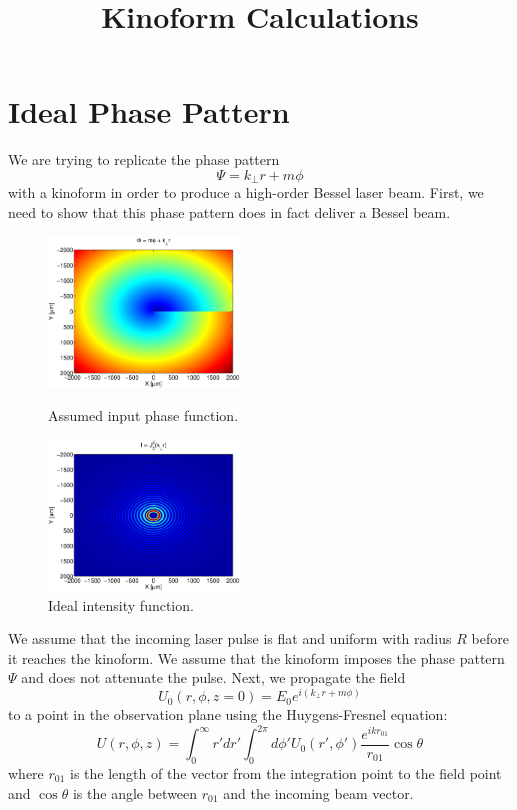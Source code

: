 \documentclass[12pt]{revtex4-1}
\title{Kinoform Calculations}
\begin{document}
\maketitle

\section{Ideal Phase Pattern}
We are trying to replicate the phase pattern
\begin{equation}
\Psi = k_{\perp}r+m\phi
\end{equation}
with a kinoform in order to produce a high-order Bessel laser beam. First, we need to show that this phase pattern does in fact deliver a Bessel beam. 

\begin{figure}[tbh]
\centering
\begin{minipage}[t]{.45\textwidth}
\centering
\includegraphics[width=.8\textwidth,height=4cm]{phase_func.eps}
\caption{Assumed input phase function.}
\end{minipage}\hfill
\begin{minipage}[t]{.45\textwidth}
\centering
\includegraphics[width=.8\textwidth,height=4cm]{ideal_intensity.eps}
\caption{Ideal intensity function.}
\end{minipage}
\end{figure}

We assume that the incoming laser pulse is flat and uniform with radius $R$ before it reaches the kinoform. We assume that the kinoform imposes the phase pattern $\Psi$ and does not attenuate the pulse. Next, we propagate the field
\begin{equation}
U_0(r,\phi,z=0) = E_0 e^{i(k_{\perp}r+m\phi)}
\end{equation}
to a point in the observation plane using the Huygens-Fresnel equation:
\begin{equation}
U(r,\phi,z) = \int_0^\infty r'dr' \int_0^{2\pi} d\phi' U_0(r',\phi')\frac{e^{ikr_{01}}}{r_{01}}\cos{\theta}
\end{equation}
where $r_{01}$ is the length of the vector from the integration point to the field point and $\cos\theta$ is the angle between $r_{01}$ and the incoming beam vector.
\end{document}
